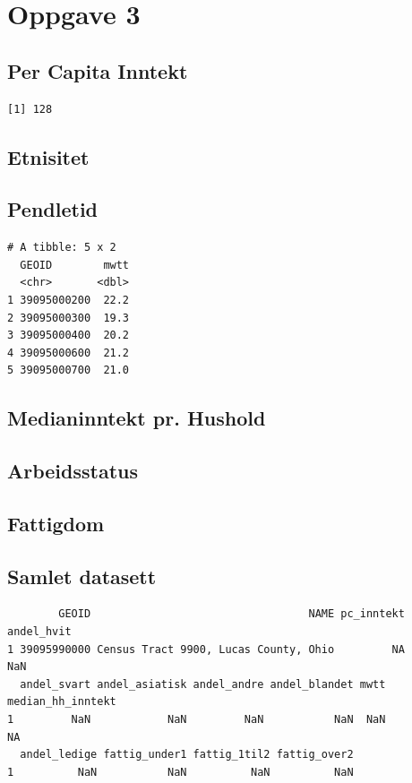 \documentclass[
  norsk,
  a4paper,
]{article}
\begin{document}
\section{Oppgave 3}\label{oppgave-3}

\subsection{Per Capita Inntekt}\label{per-capita-inntekt}

\begin{verbatim}
[1] 128
\end{verbatim}

\subsection{Etnisitet}\label{etnisitet}

\subsection{Pendletid}\label{pendletid}

\begin{verbatim}
# A tibble: 5 x 2
  GEOID        mwtt
  <chr>       <dbl>
1 39095000200  22.2
2 39095000300  19.3
3 39095000400  20.2
4 39095000600  21.2
5 39095000700  21.0
\end{verbatim}

\subsection{Medianinntekt pr. Hushold}\label{medianinntekt-pr.-hushold}

\subsection{Arbeidsstatus}\label{arbeidsstatus}

\subsection{Fattigdom}\label{fattigdom}

\subsection{Samlet datasett}\label{samlet-datasett}

\begin{verbatim}
        GEOID                                  NAME pc_inntekt andel_hvit
1 39095990000 Census Tract 9900, Lucas County, Ohio         NA        NaN
  andel_svart andel_asiatisk andel_andre andel_blandet mwtt median_hh_inntekt
1         NaN            NaN         NaN           NaN  NaN                NA
  andel_ledige fattig_under1 fattig_1til2 fattig_over2
1          NaN           NaN          NaN          NaN
\end{verbatim}
\end{document}
